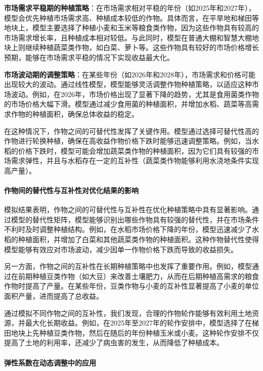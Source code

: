 \documentclass[12pt,a4paper]{nmmcm}
\begin{document}
\textbf{市场需求平稳期的种植策略}：在市场需求相对平稳的年份（如2025年和2027年），模型会优先种植市场需求高、种植成本较低的作物。具体而言，在平旱地和梯田等地块上，模型主要选择了种植小麦和玉米等粮食类作物，因为这些作物具有较高的市场需求增长率，且种植成本相对较低。与此同时，模型在普通大棚和智慧大棚地块上则继续种植蔬菜类作物，如白菜、萝卜等。这些作物具有较好的市场价格增长预期，能够在市场需求平稳的情况下实现收益最大化。

\textbf{市场波动期的调整策略}：在某些年份（如2026年和2028年），市场需求和价格可能出现较大的波动。通过线性模型，模型能够灵活调整作物种植策略，以适应这种市场波动。例如，在2026年，市场价格出现了显著下降的趋势，尤其是食用菌类作物的市场价格大幅下滑。模型通过减少食用菌的种植面积，并增加水稻、蔬菜等高需求作物的种植面积，确保总体收益的稳定。

在这种情况下，作物之间的可替代性发挥了关键作用。模型通过选择可替代性高的作物进行轮换种植，确保在高收益作物价格下跌时能够迅速调整策略。例如，当水稻的价格下跌时，模型可能会增加蔬菜类作物的种植面积，因为它们具有较强的市场需求弹性，并且与水稻存在一定的互补性（蔬菜类作物能够利用水浇地条件实现高产量）。

\paragraph{作物间的替代性与互补性对优化结果的影响}

模拟结果表明，作物之间的可替代性与互补性在优化种植策略中具有显著影响。通过模型的替代性矩阵，模型能够识别出哪些作物具有较强的替代性，并在市场条件不利时及时调整种植结构。例如，在水稻市场价格下降的年份，模型迅速减少了水稻的种植面积，并增加了白菜和其他蔬菜类作物的种植面积。这种作物替代性使得模型能够有效应对市场波动，减少因单一作物价格下跌而导致的收益损失。

另一方面，作物之间的互补性在长期种植策略中也发挥了重要作用。例如，模型通过在前期种植豆类作物（如大豆）来改善土壤肥力，从而在后期种植高需求的粮食作物时提高了产量。在某些年份，豆类作物与小麦的互补性显著提高了小麦的单位面积产量，进而提高了总收益。

通过模拟不同作物之间的互补性，我们发现，合理的作物轮作能够有效利用土地资源，并最大化长期收益。例如，在2025年至2027年的轮作安排中，模型选择了在梯田地块上先种植豆类作物，然后在随后的年份种植玉米或小麦。这种轮作安排不仅提高了土地的利用率，还减少了病虫害的发生，从而降低了种植成本。

\paragraph{弹性系数在动态调整中的应用}
\end{document}
